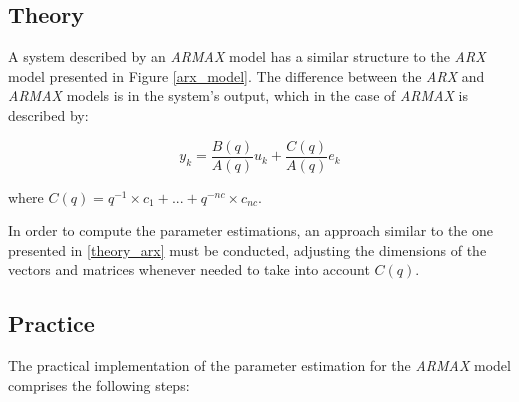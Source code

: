 \documentclass[11pt]{article}
\begin{document}
\subsection{Theory}
\label{theory_armax}

A system described by an \emph{ARMAX} model has a similar structure to the \emph{ARX} model presented in Figure \ref{arx_model}. The difference between the \emph{ARX} and \emph{ARMAX} models is in the system's output, which in the case of \emph{ARMAX} is described by:

$$y_{k} = \frac{B(q)}{A(q)} u_{k} + \frac{C(q)}{A(q)} e_{k} $$

where $C(q) = q^{-1} \times c_{1} + ... + q^{-nc} \times c_{nc}$.

In order to compute the parameter estimations, an approach similar to the one presented in \ref{theory_arx} must be conducted, adjusting the dimensions of the vectors and matrices whenever needed to take into account $C(q)$.

\subsection{Practice}
\label{parameter_estimation_armax}

The practical implementation of the parameter estimation for the \emph{ARMAX} model comprises the following steps:
\end{document}
